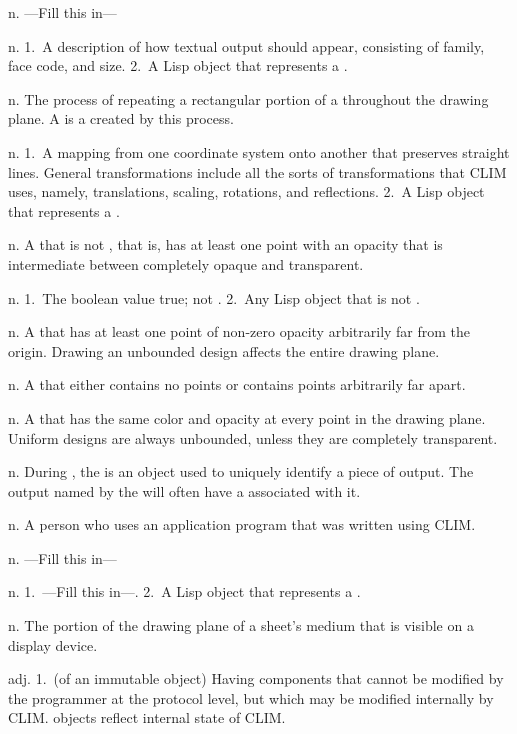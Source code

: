 \begin{description}
 {n.} {---Fill this in---}

 {n.} {1.~A description of how textual output should
appear, consisting of family, face code, and size.  2.~A Lisp object that
represents a .}

 {n.} {The process of repeating a rectangular portion of
a  throughout the drawing plane.  A  is a 
created by this process.}

 {n.} {1.~A mapping from one coordinate system
onto another that preserves straight lines.  General transformations include all
the sorts of transformations that CLIM uses, namely, translations, scaling,
rotations, and reflections.  2.~A Lisp object that represents a
.}

 {n.} {A  that is not
, that is, has at least one point with an opacity that is
intermediate between completely opaque and transparent.}

 {n.} {1.~The boolean value true; not .  2.~Any
Lisp object that is not .}

 {n.} {A  that has at least one
point of non-zero opacity arbitrarily far from the origin.  Drawing an unbounded
design affects the entire drawing plane.}

 {n.} {A  that either contains no
points or contains points arbitrarily far apart.}

 {n.} {A  that has the same color
and opacity at every point in the drawing plane.  Uniform designs are always
unbounded, unless they are completely transparent.}

 {n.} {During , the
 is an object used to uniquely identify a piece of output.  The
output named by the  will often have a 
associated with it.}

 {n.} {A person who uses an application program that was
written using CLIM.}

 {n.} {---Fill this in---}

 {n.} {1.~---Fill this in---.  2.~A Lisp object that
represents a .}

 {n.} {The portion of the drawing plane of a sheet's
medium that is visible on a display device.}

 {adj.} {1.~(of an immutable object) Having components
that cannot be modified by the programmer at the protocol level, but which may
be modified internally by CLIM.   objects reflect internal state
of CLIM.}

\end{description}
